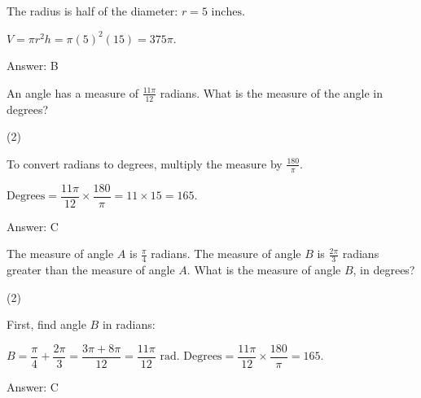 \documentclass[11pt,paper=a4,answers]{exam}
\begin{document}
\begin{questions}
\begin{solution}
The radius is half of the diameter: $r = 5 \text{ inches}$.
\vspace{5pt}
\begin{center}
$V = \pi r^2 h = \pi (5)^2 (15) = 375\pi$.
\end{center}
\vspace{5pt}
Answer: \colorbox{yellow!100}{B}
\end{solution}

\vspace{1cm}

\question
An angle has a measure of $\frac{11\pi}{12}$ radians. What is the measure of the angle in degrees?
\begin{tasks}(2)
\end{tasks}

\begin{solution}
To convert radians to degrees, multiply the measure by $\frac{180}{\pi}$.
\vspace{5pt}
\begin{center}
$\text{Degrees} = \dfrac{11\pi}{12} \times \dfrac{180}{\pi} = 11 \times 15 = 165$.
\end{center}
\vspace{5pt}
Answer: \colorbox{yellow!100}{C}
\end{solution}

\vspace{1cm}

\question
The measure of angle $A$ is $\frac{\pi}{4}$ radians. The measure of angle $B$ is $\frac{2\pi}{3}$ radians greater than the measure of angle $A$. What is the measure of angle $B$, in degrees?
\begin{tasks}(2)
\end{tasks}

\begin{solution}
First, find angle $B$ in radians:
\vspace{5pt}
\begin{center}
$B = \dfrac{\pi}{4} + \dfrac{2\pi}{3} = \dfrac{3\pi + 8\pi}{12} = \dfrac{11\pi}{12} \text{ rad}$.
\vspace{5pt}
$\text{Degrees} = \dfrac{11\pi}{12} \times \dfrac{180}{\pi} = 165$.
\end{center}
\vspace{5pt}
Answer: \colorbox{yellow!100}{C}
\end{solution}


\end{questions}
\end{document}
